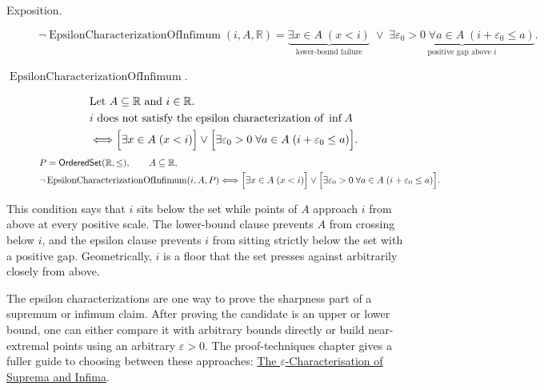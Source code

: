 \begin{remark*}
\begin{description}
  \item[Exposition.]
\[
\neg\operatorname{EpsilonCharacterizationOfInfimum}(i,A,\mathbb{R})
=
\underbrace{\exists x\in A\;(x<i)}_{\text{lower-bound failure}}
\;\lor\;
\underbrace{\exists \varepsilon_0>0\;\forall a\in A\;(i+\varepsilon_0\le a)}_{\text{positive gap above }i}.
\]


  \item[\(\operatorname{EpsilonCharacterizationOfInfimum}.\)]
  \[
\begin{aligned}
&\text{Let } A\subseteq\mathbb{R} \text{ and } i\in\mathbb{R}.\\
&i \text{ does not satisfy the epsilon characterization of } \inf A\\
&\Longleftrightarrow
\Bigl[\exists x\in A\;(x<i)\Bigr]
\lor
\Bigl[\exists \varepsilon_0>0\;\forall a\in A\;(i+\varepsilon_0\le a)\Bigr].
\end{aligned}
\]
\[
\begin{aligned}
&P=\mathsf{OrderedSet}(\mathbb{R},\leq),\qquad A\subseteq\mathbb{R},\\
&\neg\operatorname{EpsilonCharacterizationOfInfimum}(i,A,P)\Longleftrightarrow
\Bigl[\exists x\in A\;(x<i)\Bigr]
\lor
\Bigl[\exists \varepsilon_0>0\;\forall a\in A\;(i+\varepsilon_0\le a)\Bigr].
\end{aligned}
\]
\end{description}
\end{remark*}

\begin{remark*}[Interpretation]
This condition says that $i$ sits below the set while points of $A$ approach $i$ from above at every positive scale. The lower-bound clause prevents $A$ from crossing below $i$, and the epsilon clause prevents $i$ from sitting strictly below the set with a positive gap. Geometrically, $i$ is a floor that the set presses against arbitrarily closely from above.


The epsilon characterizations are one way to prove the sharpness part of a
supremum or infimum claim.  After proving the candidate is an upper or lower
bound, one can either compare it with arbitrary bounds directly or build
near-extremal points using an arbitrary $\varepsilon>0$.  The proof-techniques
chapter gives a fuller guide to choosing between these approaches:
\hyperref[subsec:eps-char]{The $\varepsilon$-Characterisation of Suprema and
Infima}.
\end{remark*}

